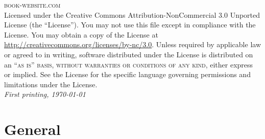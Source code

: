 \documentclass[11pt,fleqn]{book} %
\begin{document}
\noindent \textsc{book-website.com}\\ %

\noindent Licensed under the Creative Commons Attribution-NonCommercial 3.0 Unported License (the ``License''). You may not use this file except in compliance with the License. You may obtain a copy of the License at \url{http://creativecommons.org/licenses/by-nc/3.0}. Unless required by applicable law or agreed to in writing, software distributed under the License is distributed on an \textsc{``as is'' basis, without warranties or conditions of any kind}, either express or implied. See the License for the specific language governing permissions and limitations under the License.\\ %

\noindent \textit{First printing, \today } %




\pagestyle{empty} %

\tableofcontents %

\cleardoublepage %

\pagestyle{fancy} %


\part{General}

\end{document}
